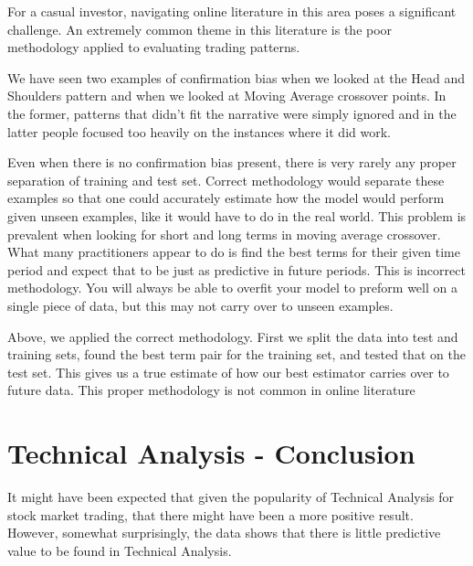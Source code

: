 \documentclass{report}
\begin{document}
For a casual investor, navigating online literature in this area poses a significant challenge. An extremely common theme in this literature is the poor methodology applied to evaluating trading patterns.

We have seen two examples of confirmation bias when we looked at the Head and Shoulders pattern and when we looked at Moving Average crossover points. In the former, patterns that didn't fit the narrative were simply ignored and in the latter people focused too heavily on the instances where it did work.

Even when there is no confirmation bias present, there is very rarely any proper separation of training and test set. Correct methodology would separate these examples so that one could accurately estimate how the model would perform given unseen examples, like it would have to do in the real world. This problem is prevalent when looking for short and long terms in moving average crossover. What many practitioners appear to do is find the best terms for their given time period and expect that to be just as predictive in future periods. This is incorrect methodology. You will always be able to overfit your model to preform well on a single piece of data, but this may not carry over to unseen examples.

Above, we applied the correct methodology. First we split the data into test and training sets, found the best term pair for the training set, and tested that on the test set. This gives us a true estimate of how our best estimator carries over to future data. This proper methodology is not common in online literature


\section{Technical Analysis - Conclusion}

It might have been expected that given the popularity of Technical Analysis for stock market trading, that there might have been a more positive result. However, somewhat surprisingly, the data shows that there is little predictive value to be found in Technical Analysis. 
\end{document}
